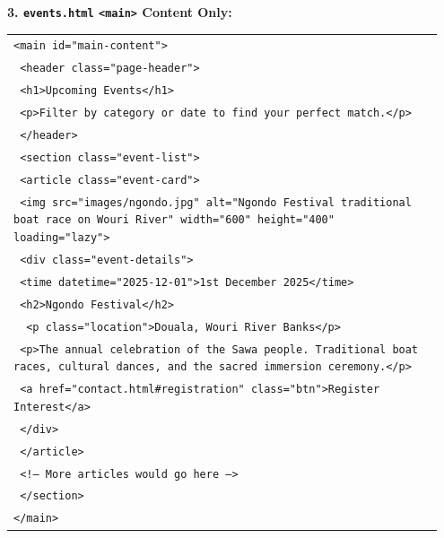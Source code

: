 \documentclass[11pt]{article}
\begin{document}
\begin{exoresolu}
\textbf{3. \texttt{events.html} \textemdash \texttt{<main>} Content Only:}
\begin{center}
\begin{tabular}{|p{0.95\linewidth}|}\hline
\texttt{<main id="main-content">}\\
\texttt{  <header class="page-header">}\\
\texttt{    <h1>Upcoming Events</h1>}\\
\texttt{    <p>Filter by category or date to find your perfect match.</p>}\\
\texttt{  </header>}\\
\texttt{  <section class="event-list">}\\
\texttt{    <article class="event-card">}\\
\texttt{      <img src="images/ngondo.jpg" alt="Ngondo Festival traditional boat race on Wouri River" width="600" height="400" loading="lazy">}\\
\texttt{      <div class="event-details">}\\
\texttt{        <time datetime="2025-12-01">1st December 2025</time>}\\
\texttt{        <h2>Ngondo Festival</h2>}\\\
\texttt{        <p class="location">Douala, Wouri River Banks</p>}\\
\texttt{        <p>The annual celebration of the Sawa people. Traditional boat races, cultural dances, and the sacred immersion ceremony.</p>}\\
\texttt{        <a href="contact.html\#registration" class="btn">Register Interest</a>}\\
\texttt{      </div>}\\
\texttt{    </article>}\\
\texttt{    }\texttt{<!-- More articles would go here -->}\\
\texttt{  </section>}\\
\texttt{</main>}\\\hline
\end{tabular}
\end{center}


\end{exoresolu}
\end{document}
